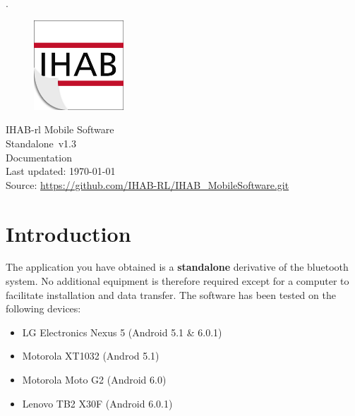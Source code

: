 \documentclass[11pt,a4paper,titlepage]{article}
\newcommand{\titleFull}{IHAB-rl Mobile Software\\\vspace{0.5cm}Standalone}
\newcommand{\version}{v1.3}
\begin{document}
 
\pagestyle{empty}

\sffamily
\mdseries


\textcolor[rgb]{1,1,1}{.}
	\vspace{3cm}
	\begin{center}
	
	\begin{figure}[h]
		\centering
			\includegraphics[width=0.30\textwidth]{images/Logo_shadow.jpg}
		\label{fig:Fahrplan}
	\end{figure}
	\vspace{3cm}
	\Huge
	\titleFull \ \version
	\normalsize
	\\
	\vspace{1cm}
	Documentation\\
	\vspace{1cm}
	Last updated: \today\\
	\vspace{1cm}
	Source: \url{https://github.com/IHAB-RL/IHAB_MobileSoftware.git}
	\vfill
	\end{center}

%
\clearpage

\tableofcontents

\clearpage

\setcounter{page}{1}
\pagestyle{fancy}

\section{Introduction}

The application you have obtained is a \textbf{standalone} derivative of the bluetooth system. No additional equipment is therefore required except for a computer to facilitate installation and data transfer. The software has been tested on the following devices:
\begin{itemize}
	\item LG Electronics Nexus 5 (Android 5.1 \& 6.0.1)
	\item Motorola XT1032 (Androd 5.1)
	\item Motorola Moto G2  (Android 6.0)
	\item Lenovo TB2 X30F (Android 6.0.1)
\end{itemize}
\end{document}
